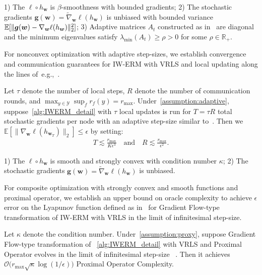 \begin{assumption}
\label{assumption:adaptive} 1) The $\ell\circ h_{\boldsymbol{w}}$ is $\beta$-smoothness with bounded gradients; 2) The stochastic gradients $\boldsymbol{g}(\boldsymbol{w})=\widetilde\nabla_{\boldsymbol{w}}\ell(h_{\boldsymbol{w}})$ is unbiased with bounded variance $\mathbb{E}[\|\boldsymbol{g}(\boldsymbol{w})-\nabla_{\boldsymbol{w}}\ell(h_{\boldsymbol{w}})\|_2^2]$; 3) Adaptive matrices $A_t$ constructed as in~\citep[Algorithm 2]{AdaptiveFL} are diagonal and the minimum eigenvalues satisfy $\lambda_{\min}(A_t) \geq \rho >0$ for some $\rho\in\mathbb{R}_+$.%
\end{assumption}

For nonconvex optimization with adaptive step-sizes, we establish convergence and communication guarantees for IW-ERM with VRLS and local updating along the lines of~e.g.,~\citep[Theorem 2]{AdaptiveFL}.


\begin{theorem}\label{app:adaptive} Let $\tau$ denote the number of local steps,  $R$ denote the number of communication rounds, and $\max_{y\in\mathcal{Y}}\sup_f r_f(y)=r_{\max}$. Under~\cref{assumption:adaptive}, suppose~\cref{alg:IWERM_detail} with $\tau$ local updates is run for $T=\tau R$ total stochastic gradients per node with an adaptive step-size similar to~\citep[Algorithm 2]{AdaptiveFL}. Then we $\mathbb{E}[\|\nabla_{\boldsymbol{w}}\ell(h_{\boldsymbol{w}_T})\|_2] \leq \epsilon$ by setting: 
\begin{align}
T\lesssim  \frac{r_{\max}}{K\epsilon^3}\quad \text{and} \quad R\lesssim\frac{r_{\max}}{\epsilon^2}. 
\end{align}
\end{theorem}


\begin{assumption}\label{assumption:proxy} 1) The $\ell\circ h_{\boldsymbol{w}}$ is smooth and strongly convex with condition number $\kappa$; 2) The stochastic gradients $\boldsymbol{g}(\boldsymbol{w})=\widetilde\nabla_{\boldsymbol{w}}\ell(h_{\boldsymbol{w}})$ is unbiased.
\end{assumption}

For composite optimization with strongly convex and smooth functions and proximal operator, we establish an upper bound on oracle complexity to achieve $\epsilon$ error on the  Lyapunov function defined as in~\citep[Section 4]{Prox}  for Gradient Flow-type transformation of IW-ERM with VRLS in the limit of infinitesimal step-size.

\begin{theorem}\label{app:proxy} Let $\kappa$ denote the condition number.  Under~\cref{assumption:proxy}, suppose Gradient Flow-type transformation of ~\cref{alg:IWERM_detail} with VRLS and Proximal Operator evolves in the limit of infinitesimal step-size ~\citep[Algorithm 3]{Prox}.
Then it achieves $\mathcal{O}\big(r_{\max}\sqrt{\kappa}\log(1/\epsilon)\big)$ Proximal Operator Complexity.
\end{theorem}
